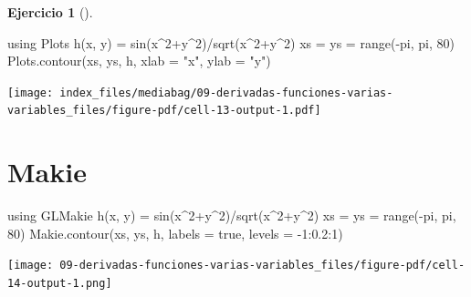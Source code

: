 \documentclass[
  a4paper,
]{scrreport}
\newenvironment{Shaded}{\begin{snugshade}}{\end{snugshade}}
\newcommand{\BuiltInTok}[1]{\textcolor[rgb]{0.00,0.23,0.31}{#1}}
\newcommand{\ConstantTok}[1]{\textcolor[rgb]{0.56,0.35,0.01}{#1}}
\newcommand{\FloatTok}[1]{\textcolor[rgb]{0.68,0.00,0.00}{#1}}
\newcommand{\FunctionTok}[1]{\textcolor[rgb]{0.28,0.35,0.67}{#1}}
\newcommand{\ImportTok}[1]{\textcolor[rgb]{0.00,0.46,0.62}{#1}}
\newcommand{\NormalTok}[1]{\textcolor[rgb]{0.00,0.23,0.31}{#1}}
\newcommand{\OperatorTok}[1]{\textcolor[rgb]{0.37,0.37,0.37}{#1}}
\newcommand{\StringTok}[1]{\textcolor[rgb]{0.13,0.47,0.30}{#1}}
\theoremstyle{definition}
\newtheorem{exercise}{Ejercicio}[chapter]
\theoremstyle{remark}
\begin{document}
\begin{exercise}[]
\begin{enumerate}
\begin{tcolorbox}
\begin{Shaded}
\begin{Highlighting}[]
\ImportTok{using} \BuiltInTok{Plots}
\FunctionTok{h}\NormalTok{(x, y) }\OperatorTok{=} \FunctionTok{sin}\NormalTok{(x}\OperatorTok{\^{}}\FloatTok{2}\OperatorTok{+}\NormalTok{y}\OperatorTok{\^{}}\FloatTok{2}\NormalTok{)}\OperatorTok{/}\FunctionTok{sqrt}\NormalTok{(x}\OperatorTok{\^{}}\FloatTok{2}\OperatorTok{+}\NormalTok{y}\OperatorTok{\^{}}\FloatTok{2}\NormalTok{)}
\NormalTok{xs }\OperatorTok{=}\NormalTok{ ys }\OperatorTok{=} \FunctionTok{range}\NormalTok{(}\OperatorTok{{-}}\ConstantTok{pi}\NormalTok{, }\ConstantTok{pi}\NormalTok{, }\FloatTok{80}\NormalTok{)}
\NormalTok{Plots.}\FunctionTok{contour}\NormalTok{(xs, ys, h, xlab }\OperatorTok{=} \StringTok{"x"}\NormalTok{, ylab }\OperatorTok{=} \StringTok{"y"}\NormalTok{)}
\end{Highlighting}
\end{Shaded}

  \texttt{[image: index\_files/mediabag/09-derivadas-funciones-varias-variables\_files/figure-pdf/cell-13-output-1.pdf]}

  \section{Makie}

\begin{Shaded}
\begin{Highlighting}[]
\ImportTok{using} \BuiltInTok{GLMakie}
\FunctionTok{h}\NormalTok{(x, y) }\OperatorTok{=} \FunctionTok{sin}\NormalTok{(x}\OperatorTok{\^{}}\FloatTok{2}\OperatorTok{+}\NormalTok{y}\OperatorTok{\^{}}\FloatTok{2}\NormalTok{)}\OperatorTok{/}\FunctionTok{sqrt}\NormalTok{(x}\OperatorTok{\^{}}\FloatTok{2}\OperatorTok{+}\NormalTok{y}\OperatorTok{\^{}}\FloatTok{2}\NormalTok{)}
\NormalTok{xs }\OperatorTok{=}\NormalTok{ ys }\OperatorTok{=} \FunctionTok{range}\NormalTok{(}\OperatorTok{{-}}\ConstantTok{pi}\NormalTok{, }\ConstantTok{pi}\NormalTok{, }\FloatTok{80}\NormalTok{)}
\NormalTok{Makie.}\FunctionTok{contour}\NormalTok{(xs, ys, h, labels }\OperatorTok{=} \ConstantTok{true}\NormalTok{,  levels }\OperatorTok{=} \OperatorTok{{-}}\FloatTok{1}\OperatorTok{:}\FloatTok{0.2}\OperatorTok{:}\FloatTok{1}\NormalTok{)}
\end{Highlighting}
\end{Shaded}

  \texttt{[image: 09-derivadas-funciones-varias-variables\_files/figure-pdf/cell-14-output-1.png]}

  \end{tcolorbox}
\end{enumerate}

\end{exercise}
\end{document}
